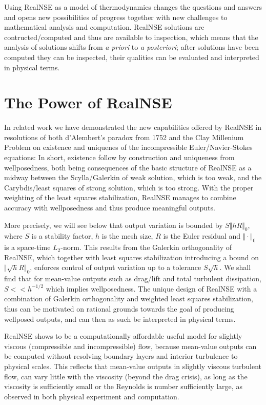 Using RealNSE as a model of thermodynamics changes the questions 
and answers and opens new possibilities of progress together with
new challenges to mathematical analysis and computation.
RealNSE solutions are contructed/computed and thus 
are available to inspection, which means that the analysis of solutions 
shifts from \emph{a priori} to \emph{a posteriori}; after solutions
have been computed they can be inspected, their qualities can be
evaluated and interpreted in physical terms. 






\section{The Power of RealNSE}

In related work \cite{dAlembert,blowup,ambsflow} we have demonstrated
the new capabilities offered by RealNSE in resolutions of both d'Alembert's paradox from 1752 
and the Clay Millenium Problem on existence and uniquenes of the incompressible 
Euler/Navier-Stokes equations:
In short, existence follow by construction and uniqueness from wellposedness,  both being 
consequences of the basic structure of RealNSE as a midway between the Scylla/Galerkin of weak solution,
which is too weak, and the Carybdis/least squares of strong solution, which is too strong.
With the proper weighting of the least squares stabilization, RealNSE manages to
combine accuracy with wellposedness and thus produce meaningful outputs.  

More precisely, we will see below that output variation is 
bounded by  
$S\Vert hR\Vert_0$, where $S$ is a stability factor, $h$ is 
the mesh size, $R$ is the Euler residual and $\Vert\cdot\Vert_0$ is 
a space-time $L_2$-norm. This results from the Galerkin orthogonality
of RealNSE, which together with least squares stabilization 
introducing a bound on $\Vert\sqrt{h}R\Vert_0$,  enforces control of output 
variation up to a tolerance $S\sqrt{h}$. We shall find that for mean-value 
outputs such 
as drag/lift and total turbulent dissipation, $S<<h^{-1/2}$ 
which implies wellposedness. The unique design of RealNSE with a combination of 
Galerkin orthogonality and weighted least squares stabilization, thus 
can be motivated on rational grounds towards the goal of 
producing wellposed outputs, and can then as such be interpreted in physical
terms.  
 

RealNSE shows to be a computationally affordable useful model for 
slightly viscous (compressible and incompressible) flow, because 
mean-value outputs can be computed without resolving  
boundary layers and interior turbulence to physical scales.
This reflects that mean-value outputs 
in slightly viscous turbulent flow, can vary little 
with the viscosity (beyond the drag crisis), as long as
the viscosity is sufficiently small or the Reynolds is number sufficiently
large, as observed in both physical experiment and computation.

